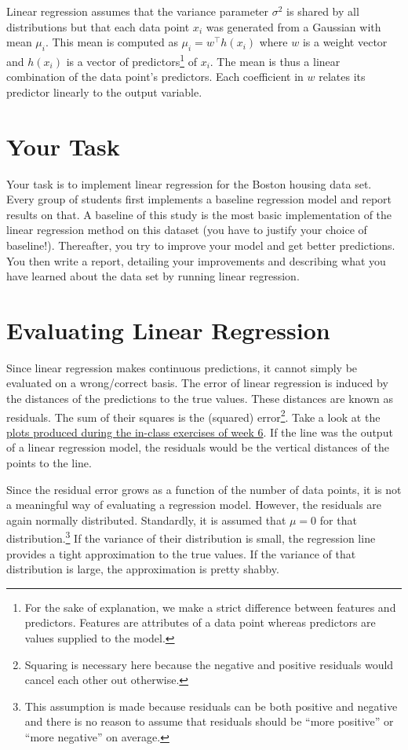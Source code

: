 \documentclass[11pt, leqno, a4paper]{article}
\begin{document}
Linear regression assumes that the variance parameter $ \sigma^{2} $ is shared by all distributions
but that each data point $ x_{i} $ was generated from a Gaussian with mean $ \mu_{i} $. This mean
is computed as $ \mu_{i} = w^{\top}h(x_{i}) $ where $ w $ is a weight vector and $ h(x_{i}) $ is
a vector of predictors\footnote{For the sake of explanation, we make a strict difference between
features and predictors. Features are attributes of a data point whereas predictors are values
supplied to the model.} of $ x_{i} $. The mean is thus a linear combination of the data point's predictors.
Each coefficient in $ w $ relates its predictor linearly to the output variable.

\section{Your Task}

Your task is to implement linear regression for the Boston housing data set. Every group of students first implements a baseline regression model and report results on that. A baseline of this study is the most basic implementation of the linear regression method on this dataset (you have to justify your choice of 
baseline!). Thereafter, you try to improve your model and get better predictions. You then write a report, detailing your improvements and describing what you have learned about the data set by running linear regression.

\section{Evaluating Linear Regression}

Since linear regression makes continuous predictions, it cannot simply be evaluated on a wrong/correct
basis. The error of linear regression is induced by the distances of the predictions to the true values.
These distances are known as residuals. The sum of their squares is the (squared) error\footnote{Squaring
is necessary here because the negative and positive residuals would cancel each other out otherwise.}. 
Take a look at the
\href{https://github.com/BasicProbability/InClassExercises2016/raw/master/numpy_and_matplotlib/plot.pdf}{plots produced during the in-class exercises of week 6}. If the line was the output of a linear 
regression model, the residuals would be the vertical distances of the points to the line.

Since the residual error grows as a function of the number of data points, it is not a meaningful
way of evaluating a regression model. However, the residuals are again normally distributed. Standardly,
it is assumed that $ \mu=0 $ for that distribution.\footnote{This assumption is made because
residuals can be both positive and negative and there is no reason to assume that residuals should
be ``more positive'' or ``more negative'' on average.} If the
variance of their distribution is small, the regression line provides a tight approximation to the
true values. If the variance of that distribution is large, the approximation is pretty shabby. 
\end{document}
